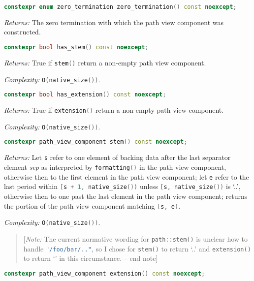 \documentclass[11pt]{article}
\newcommand{\code}[2][cpp]{\lstinline[language=#1,basicstyle=\small\ttfamily]{#2}}
\newcommand{\desc}[1]{\textit{#1}}
\newcommand{\returns}{\desc{Returns: }}
\newcommand{\complexity}{\desc{Complexity: }}
\newcommand{\note}[1]{\begin{quote}[\textit{Note:} #1 -- end note]\end{quote}}
\begin{document}
\begin{lstlisting}[language=cpp]
    constexpr enum zero_termination zero_termination() const noexcept;
\end{lstlisting}

\returns The zero termination with which the path view component was constructed.\\

\begin{lstlisting}[language=cpp]
    constexpr bool has_stem() const noexcept;
\end{lstlisting}

\returns True if \code{stem()} return a non-empty path view component.

\complexity \code{O(native_size())}.\\

\begin{lstlisting}[language=cpp]
    constexpr bool has_extension() const noexcept;
\end{lstlisting}

\returns True if \code{extension()} return a non-empty path view component.

\complexity \code{O(native_size())}.\\

\begin{lstlisting}[language=cpp]
    constexpr path_view_component stem() const noexcept;
\end{lstlisting}

\returns Let \code{s} refer to one element of backing data after the last separator element \emph{sep} as interpreted by \code{formatting()} in the path view component, otherwise then to the first element in the path view component; let \code{e} refer to the last period within \code{[s + 1, native_size())} unless \code{[s, native_size())} is `..', otherwise then to one past the last element in the path view component; returns the portion of the path view component matching \code{[s, e)}.

\complexity \code{O(native_size())}.\\

\color{black}

\note{The current normative wording for \code{path::stem()} is unclear how to handle \code{"/foo/bar/.."}, so I chose for \code{stem()} to return `..' and \code{extension()} to return `' in this circumstance.}

\color{darkgreen}

\begin{lstlisting}[language=cpp]
    constexpr path_view_component extension() const noexcept;
\end{lstlisting}
\end{document}
